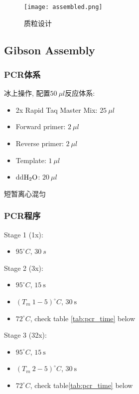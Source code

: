 \documentclass{article}
\begin{document}
\begin{figure}
    \centering
    \texttt{[image: assembled.png]}
    \caption{质粒设计}
    \label{fig:plasmid}
\end{figure}

\subsection{Gibson Assembly}

\subsubsection{PCR体系}

冰上操作, 配置$50\ \mu l$反应体系:

\begin{itemize}
    \item 2x Rapid Taq Master Mix: $25\ \mu l$
    \item Forward primer: $2\ \mu l$
    \item Reverse primer: $2\ \mu l$
    \item Template: $1\ \mu l$
    \item dd$\ce{H2O}$: $20\ \mu l$
\end{itemize}

短暂离心混匀

\subsubsection{PCR程序}

Stage 1 (1x):
\begin{itemize}
    \item $95^\circ C$, $30\ s$
\end{itemize}

Stage 2 (3x):
\begin{itemize}
    \item $95^\circ C$, $15\ \mbox{s}$
    \item $(T_m\ 1 - 5)^\circ C$, $30\ \mbox{s}$
    \item $72^\circ C$, check table \ref{tab:pcr_time} below
\end{itemize}

Stage 3 (32x):
\begin{itemize}
    \item $95^\circ C$, $15\ \mbox{s}$
    \item $(T_m\ 2 - 5)^\circ C$, $30\ \mbox{s}$
    \item $72^\circ C$, check table\ref{tab:pcr_time} below
\end{itemize}
\end{document}
